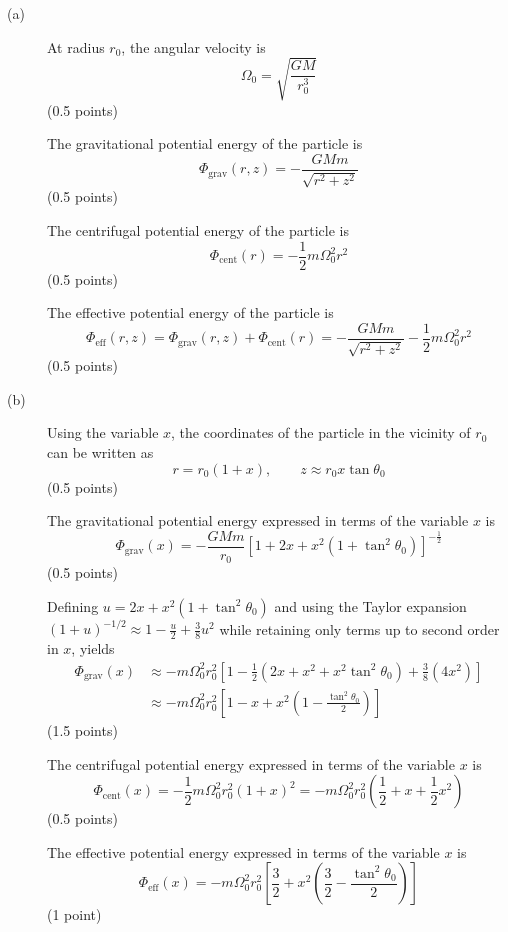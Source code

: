 \begin{description}
\item[(a)] At radius $r_0$, the angular velocity is
  \[ \Omega_0 = \sqrt{\frac{GM}{r_0^3}} \]
  \hfill(0.5 points)

  The gravitational potential energy of the particle is
  \[ \Phi_{\mathrm{grav}}(r, z) = -\frac{GMm}{\sqrt{r^2 + z^2}} \]
  \hfill(0.5 points)

  The centrifugal potential energy of the particle is
  \[ \Phi_{\mathrm{cent}}(r) = -\frac{1}{2}m\Omega_0^2 r^2 \]
  \hfill(0.5 points)

  The effective potential energy of the particle is
  \[ \Phi_{\mathrm{eff}}(r, z)
     = \Phi_{\mathrm{grav}}(r, z) + \Phi_{\mathrm{cent}}(r)
     = -\frac{GMm}{\sqrt{r^2 + z^2}} - \frac{1}{2}m\Omega_0^2 r^2 \]
  \hfill(0.5 points)

\item[(b)] Using the variable $x$, the coordinates of the particle in the
  vicinity of $r_0$ can be written as
  \[ r = r_0(1 + x), \qquad z \approx r_0 x\tan\theta_0 \]
  \hfill(0.5 points)

  The gravitational potential energy expressed in terms of the variable $x$
  is
  \[ \Phi_{\mathrm{grav}}(x)
     = -\frac{GMm}{r_0}\left[1 + 2x + x^2(1 + \tan^2\theta_0)\right]^{-\frac{1}{2}} \]
  \hfill(0.5 points)

  Defining $u = 2x + x^2(1 + \tan^2\theta_0)$ and using the Taylor expansion
  $(1 + u)^{-1/2} \approx 1 - \frac{u}{2} + \frac{3}{8}u^2$ while retaining
  only terms up to second order in $x$, yields
  \begin{align*}
    \Phi_{\mathrm{grav}}(x)
      &\approx -m\Omega_0^2 r_0^2\left[1 - \frac{1}{2}
         \left(2x + x^2 + x^2\tan^2\theta_0\right)
         + \frac{3}{8}\left(4x^2\right)\right] \\
      &\approx -m\Omega_0^2 r_0^2\left[1 - x
         + x^2\left(1 - \frac{\tan^2\theta_0}{2}\right)\right]
  \end{align*}
  \hfill(1.5 points)

  The centrifugal potential energy expressed in terms of the variable $x$ is
  \[ \Phi_{\mathrm{cent}}(x) = -\frac{1}{2}m\Omega_0^2 r_0^2(1 + x)^2
     = -m\Omega_0^2 r_0^2\left(\frac{1}{2} + x + \frac{1}{2}x^2\right) \]
  \hfill(0.5 points)

  The effective potential energy expressed in terms of the variable $x$ is
  \[ \Phi_{\mathrm{eff}}(x) = -m\Omega_0^2 r_0^2\left[\frac{3}{2}
     + x^2\left(\frac{3}{2} - \frac{\tan^2\theta_0}{2}\right)\right] \]
  \hfill(1 point)


\end{description}
